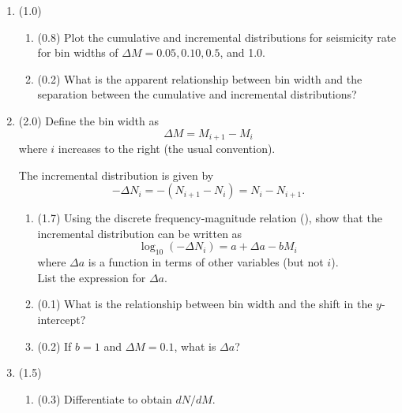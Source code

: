 \documentclass[11pt,titlepage,fleqn]{article}
\begin{document}
\begin{enumerate}

\item (1.0)
%
\begin{enumerate}
\item (0.8) Plot the cumulative and incremental distributions for seismicity rate for bin widths of $\Delta M = 0.05, 0.10, 0.5$, and 1.0.
\item (0.2) What is the apparent relationship between bin width and the separation between the cumulative and incremental distributions?
\end{enumerate}


\item (2.0) Define the bin width as
%
\begin{equation}
\Delta M = M_{i+1} - M_i
\label{dM}
\end{equation}
%
where $i$ increases to the right (the usual convention).

The incremental distribution is given by
%
\begin{equation}
-\Delta N_i = -(N_{i+1} - N_i) = N_i - N_{i+1}.
\end{equation}
%
\begin{enumerate}
\item (1.7) Using the discrete frequency-magnitude relation (), show that the incremental distribution can be written as
%
\begin{equation}
\log_{10}(-\Delta N_i) = a + \Delta a - b M_i
\label{inc}
\end{equation}
%
where $\Delta a$ is a function in terms of other variables (but not $i$). \\
List the expression for $\Delta a$.


\item (0.1) What is the relationship between bin width and the shift in the $y$-intercept?

\item (0.2) If $b = 1$ and $\Delta M = 0.1$, what is $\Delta a$?
\end{enumerate}


\item  (1.5)
%
\begin{enumerate}
\item (0.3) Differentiate  to obtain $d N/ d M$.


\end{enumerate}
\end{enumerate}
\end{document}

